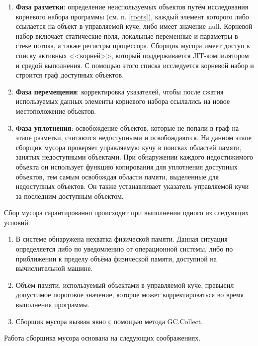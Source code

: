 \begin{enumerate}[label*=\arabic*.]
	\item \textbf{Фаза разметки}: определение неиспользуемых объектов путём исследования корневого набора программы (см. п. \ref{roots}), каждый элемент которого либо ссылается на объект в управляемой куче, либо имеет значение null. Корневой набор включает статические поля, локальные переменные и параметры в стеке потока, а также регистры процессора. Сборщик мусора имеет доступ к списку активных <<корней>>, который поддерживается JIT-компилятором и средой выполнения. С помощью этого списка исследуется корневой набор и строится граф доступных объектов.
	\item \textbf{Фаза перемещения}: корректировка указателей, чтобы после сжатия используемых данных элементы корневого набора ссылались на новое местоположение объектов.
	\item \textbf{Фаза уплотнения}: освобождение объектов, которые не попали в граф на этапе разметки, считаются недоступными и освобождаются. На данном этапе сборщик мусора проверяет управляемую кучу в поисках областей памяти, занятых недоступными объектами. При обнаружении каждого недостижимого объекта он использует функцию копирования для уплотнения доступных объектов, тем самым освобождая области памяти, выделенные для недоступных объектов. Он также устанавливает указатель управляемой кучи за последним доступным объектом. 
\end{enumerate}

Сбор мусора гарантированно происходит при выполнении одного из следующих условий.~\cite{dotnet_gc}

\begin{enumerate}[label*=\arabic*.]
	\item В системе обнаружена нехватка физической памяти. Данная ситуация определяется либо по уведомлению от операционной системы, либо по приближении к пределу объёма физической памяти, доступной на вычислительной машине.
	\item Объём памяти, используемый объектами в управляемой куче, превысил допустимое пороговое значение, которое может корректироваться во время выполнения программы.
	\item Сборщик мусора вызван явно с помощью метода GC.Collect.
\end{enumerate}

Работа сборщика мусора основана на следующих соображениях.~\cite{dotnet_gc}

